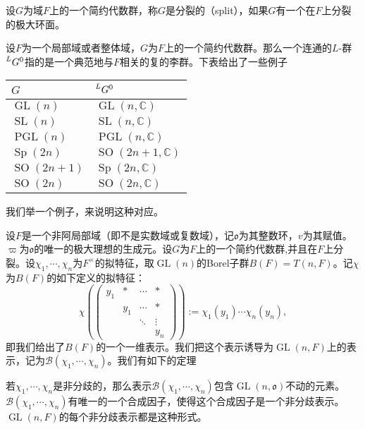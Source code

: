 \begin{definition}
设$G$为域$F$上的一个简约代数群，称$G$是分裂的（split），如果$G$有一个在$F$上分裂的极大环面。
\end{definition}

设$F$为一个局部域或者整体域，$G$为$F$上的一个简约代数群。那么一个连通的$L$-群$\prescript{L}{}{G}^0$指的是一个典范地与$F$相关的复的李群。下表给出了一些例子

\begin{table}[H]
\centering
\begin{tabular}{p{}p{}}
\toprule
$G$  & $\prescript{L}{}{G}^0$ \\
\midrule
$\operatorname{GL}(n)$ & $\operatorname{GL}(n, \mathbb{C})$ \\
$\operatorname{SL}(n)$ & $\operatorname{SL}(n, \mathbb{C})$ \\
$\operatorname{PGL}(n)$ & $\operatorname{PGL}(n, \mathbb{C})$ \\
$\operatorname{Sp}(2n)$ & $\operatorname{SO}(2n+1, \mathbb{C})$ \\
$\operatorname{SO}(2n+1)$ & $\operatorname{Sp}(2n, \mathbb{C})$ \\
$\operatorname{SO}(2n)$ & $\operatorname{SO}(2n, \mathbb{C})$ \\
\bottomrule
\end{tabular}
\end{table}

我们举一个例子，来说明这种对应。

\begin{example}
设$F$是一个非阿局部域（即不是实数域或复数域），记$\mathfrak{o}$为其整数环，$v$为其赋值。$ \varpi$为$\mathfrak{o}$的唯一的极大理想的生成元。设$G$为$F$上的一个简约代数群,并且在$F$上分裂。设$\chi_1, \cdots , \chi_n$为$F^\times$的拟特征，取$\operatorname{GL}(n)$的Borel子群$B(F) = T(n, F)$。记$\chi$为$B(F)$的如下定义的拟特征：
$$
\chi \left( \begin{pmatrix} y_1 & \ast & \cdots & \ast \\ & y_1 & \cdots & \ast \\ & & \ddots & \vdots \\ & & & y_n \end{pmatrix} \right) := \chi_1(y_1) \cdots \chi_n(y_n),
$$
即我们给出了$B(F)$的一个一维表示。我们把这个表示诱导为$\operatorname{GL}(n, F)$上的表示，记为$\mathcal{B}(\chi_1, \cdots, \chi_n)$。我们有如下的定理
\end{example}

\begin{theorem}
若$\chi_1, \cdots , \chi_n$是非分歧的，那么表示$\mathcal{B}(\chi_1, \cdots, \chi_n)$包含$\operatorname{GL}(n, \mathfrak{o})$不动的元素。$\mathcal{B}(\chi_1, \cdots, \chi_n)$有唯一的一个合成因子，使得这个合成因子是一个非分歧表示。$\operatorname{GL}(n, F)$的每个非分歧表示都是这种形式。
\end{theorem}

